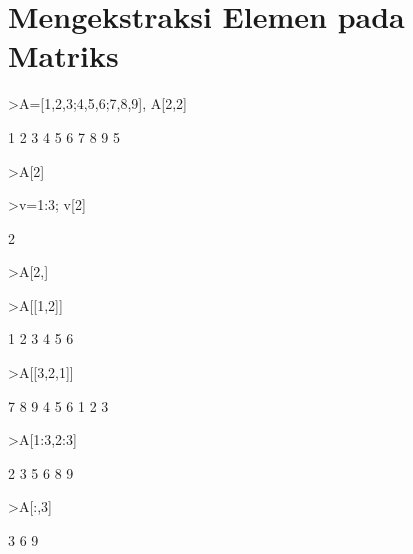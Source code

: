 \documentclass[a4paper,11pt,oneside,enabledeprecatedfontcommands]{scrbook}
\newenvironment{eulernotebook}{}{}
\newcommand{\eulerheading}[1]{\chapter{#1}}
\begin{document}
\begin{eulernotebook}
\eulerheading{Mengekstraksi Elemen pada Matriks}
\begin{eulerprompt}
>A=[1,2,3;4,5,6;7,8,9], A[2,2]
\end{eulerprompt}
\begin{euleroutput}
            1             2             3 
            4             5             6 
            7             8             9 
5
\end{euleroutput}
\begin{eulerprompt}
>A[2]
\end{eulerprompt}
\begin{euleroutput}
[4,  5,  6]
\end{euleroutput}
\begin{eulerprompt}
>v=1:3; v[2]
\end{eulerprompt}
\begin{euleroutput}
2
\end{euleroutput}
\begin{eulerprompt}
>A[2,]
\end{eulerprompt}
\begin{euleroutput}
[4,  5,  6]
\end{euleroutput}
\begin{eulerprompt}
>A[[1,2]]
\end{eulerprompt}
\begin{euleroutput}
            1             2             3 
            4             5             6 
\end{euleroutput}
\begin{eulerprompt}
>A[[3,2,1]]
\end{eulerprompt}
\begin{euleroutput}
            7             8             9 
            4             5             6 
            1             2             3 
\end{euleroutput}
\begin{eulerprompt}
>A[1:3,2:3]
\end{eulerprompt}
\begin{euleroutput}
            2             3 
            5             6 
            8             9 
\end{euleroutput}
\begin{eulerprompt}
>A[:,3]
\end{eulerprompt}
\begin{euleroutput}
            3 
            6 
            9 
\end{euleroutput}
\begin{eulerprompt}

\end{eulerprompt}
\end{eulernotebook}
\end{document}
